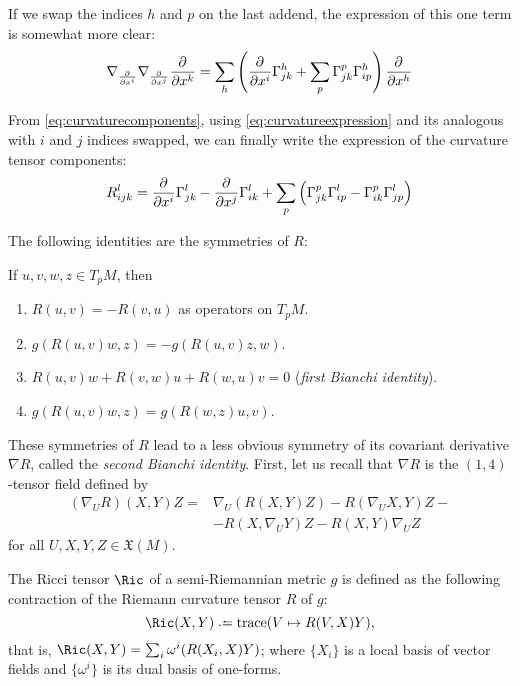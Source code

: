 If we swap the indices $h$ and $p$ on the last addend, the expression of this one term is somewhat more clear:
\begin{equation}
\label{eq:curvatureexpression}
\nabla_{\frac{\partial^{} }{\partial x^i}}\nabla_{\frac{\partial^{} }{\partial x^j}} \frac{\partial^{} }{\partial x^k} = \sum_h\left( \frac{\partial^{} }{\partial x^i} \Gamma^h_{jk} + \sum_p \Gamma^p_{jk} \Gamma^h_{ip} \right) \frac{\partial^{} }{\partial x^h}
\end{equation}

From \autoref{eq:curvaturecomponents}, using \autoref{eq:curvatureexpression} and its analogous with $i$ and $j$ indices swapped, we can finally write the expression of the curvature tensor components:
\[
R^l_{ijk} = \frac{\partial^{} }{\partial x^i} \Gamma^l_{jk} - \frac{\partial^{} }{\partial x^j} \Gamma^l_{ik} + \sum_p \left( \Gamma^p_{jk} \Gamma^l_{ip} - \Gamma^p_{ik} \Gamma^l_{jp} \right)
\]

The following identities are the symmetries of $R$:

\begin{proposition}
	If $u,v,w,z \in T_p M$, then
	\begin{enumerate}
		\item $R(u,v) = -R(v,u)$ as operators on $T_p M$.
		\item $g(R(u,v)w, z) = -g(R(u,v)z, w)$.
		\item $R(u,v)w +R(v,w)u + R(w,u)v = 0$ (\emph{first Bianchi identity}).
		\item $g(R(u,v)w,z)  = g(R(w,z)u, v)$.
	\end{enumerate}
\end{proposition}

These symmetries of $R$ lead to a less obvious symmetry of its covariant derivative $\nabla R$, called the \emph{second Bianchi identity}. First, let us recall that $\nabla R$ is the $(1,4)$-tensor field defined by
\begin{align*}
	\left( \nabla_U R \right)(X,Y)Z = &\nabla_U(R(X,Y)Z) - R(\nabla_U X, Y)Z - \\
	&-R(X, \nabla_U Y)Z - R(X,Y) \nabla_U Z
\end{align*}
for all $U,X,Y,Z \in \mathfrak{X}(M)$.

\begin{definition}
	The Ricci tensor $\Ric$ of a semi-Riemannian metric $g$ is defined as the following contraction of the Riemann curvature tensor $R$ of $g$:
	\[
		\Ric(X,Y) \defeq \operatorname{trace}(V \mapsto R(V, X)Y ),
	\]
	that is, $\Ric(X,Y) =  \sum_i \omega^i (R(X_i, X)Y)$; where $\{X_i\}$ is a local basis of vector fields and $\{\omega^i\}$ is its dual basis of one-forms.
\end{definition}

